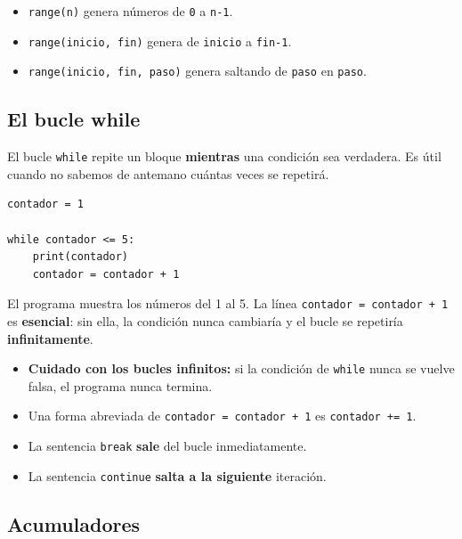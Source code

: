 \documentclass[11pt,a4paper]{article}
\begin{document}
\begin{cajaRecuerda}
\begin{itemize}
    \item \texttt{range(n)} genera números de \texttt{0} a \texttt{n-1}.
    \item \texttt{range(inicio, fin)} genera de \texttt{inicio} a \texttt{fin-1}.
    \item \texttt{range(inicio, fin, paso)} genera saltando de \texttt{paso} en \texttt{paso}.
\end{itemize}
\end{cajaRecuerda}

\subsection{El bucle while}

El bucle \texttt{while} repite un bloque \textbf{mientras} una condición sea verdadera. Es útil cuando no sabemos de antemano cuántas veces se repetirá.

\begin{cajaEjemplo}
\begin{lstlisting}[style=pythonStyle, caption={Contar hasta 5 con while}]
contador = 1

while contador <= 5:
    print(contador)
    contador = contador + 1
\end{lstlisting}

El programa muestra los números del 1 al 5. La línea \texttt{contador = contador + 1} es \textbf{esencial}: sin ella, la condición nunca cambiaría y el bucle se repetiría \textbf{infinitamente}.
\end{cajaEjemplo}

\begin{cajaRecuerda}
\begin{itemize}
    \item \textbf{Cuidado con los bucles infinitos:} si la condición de \texttt{while} nunca se vuelve falsa, el programa nunca termina.
    \item Una forma abreviada de \texttt{contador = contador + 1} es \texttt{contador += 1}.
    \item La sentencia \texttt{break} \textbf{sale} del bucle inmediatamente.
    \item La sentencia \texttt{continue} \textbf{salta a la siguiente} iteración.
\end{itemize}
\end{cajaRecuerda}

\subsection{Acumuladores}
\end{document}
